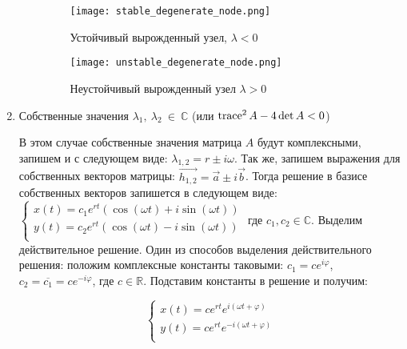 \documentclass[a4paper, 12pt]{article}
\begin{document}
\begin{enumerate}
\begin{enumerate}
        \begin{figure}[h!]
          \begin{center}
              \begin{minipage}[h!]{0.48\linewidth}
                  \texttt{[image: stable\_degenerate\_node.png]}
                  \caption{Устойчивый вырожденный узел, $\lambda < 0$}
                  \label{fig:stable_degenerate_node}
              \end{minipage}
              \hfill
              \begin{minipage}[h!]{0.48\linewidth}
                  \texttt{[image: unstable\_degenerate\_node.png]}
                  \caption{Неустойчивый вырожденный узел $\lambda > 0$}
                  \label{fig:unstable_degenerate_node}
              \end{minipage}
          \end{center}
        \end{figure}

      \end{enumerate}

      \item Собственные значения  $\lambda_1, ~ \lambda_2 ~ \in ~ \mathbb{C}$ (или $\operatorname{trace}^2 A - 4 \det A < 0$)

      В этом случае собственные значения матрица $A$ будут комплексными, запишем и с следующем виде:
      $\lambda_{1, 2} = r \pm i \omega$. Так же, запишем выражения для собственных векторов матрицы:
      $\vec{h_{1, 2}} = \vec{a} \pm i \vec{b}$. Тогда решение в базисе собственных векторов запишется в следующем виде:
      $\begin{cases}
        x(t) = c_1 e^{r t}(\cos (\omega t) + i \sin (\omega t)) \\
        y(t) = c_2 e^{r t}(\cos (\omega t) - i \sin (\omega t)) \\
      \end{cases}$
      где $c_1, c_2 \in \mathbb{C}$. Выделим действительное решение. Один из способов выделения действительного решения: положим комплексные константы таковыми: $c_1 = c e^{i \varphi}$, $c_2 = \overline{c_1} = c e^{-i \varphi}$, где $c \in \mathbb{R}$. Подставим константы в решение и получим:

      \begin{equation}
        \begin{cases}
          x(t) = c e^{r t} e^{i(\omega t + \varphi)} \\
          y(t) = c e^{r t} e^{-i(\omega t + \varphi)} \\
        \end{cases}
      \end{equation}


\end{enumerate}
\end{document}
